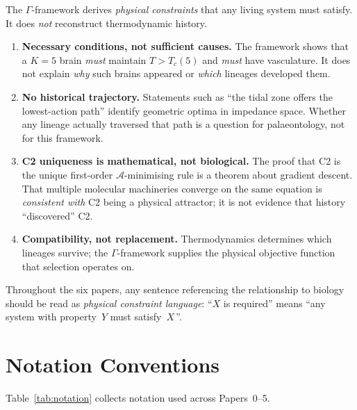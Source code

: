 \documentclass[aps,pre,twocolumn,superscriptaddress,floatfix]{revtex4-2}
\begin{document}
The $\Gamma$-framework derives \emph{physical constraints}
that any living system must satisfy.
It does \emph{not} reconstruct thermodynamic history.

\begin{enumerate}
  \item \textbf{Necessary conditions, not sufficient causes.}
    The framework shows that a $K{=}5$ brain \emph{must}
    maintain $T > T_c(5)$ and \emph{must} have vasculature.
    It does not explain \emph{why} such brains appeared
    or \emph{which} lineages developed them.

  \item \textbf{No historical trajectory.}
    Statements such as ``the tidal zone offers the
    lowest-action path'' identify geometric optima
    in impedance space.
    Whether any lineage actually traversed that path
    is a question for palaeontology, not for this
    framework.

  \item \textbf{C2 uniqueness is mathematical, not
    biological.}
    The proof that C2 is the unique first-order
    $\mathcal{A}$-minimising rule is a theorem about
    gradient descent.
    That multiple molecular machineries converge on the
    same equation is \emph{consistent with} C2 being a
    physical attractor; it is not evidence that history
    ``discovered'' C2.

  \item \textbf{Compatibility, not replacement.}
    Thermodynamics determines which lineages survive;
    the $\Gamma$-framework supplies the physical
    objective function that selection operates on.
\end{enumerate}

\noindent
Throughout the six papers, any sentence referencing
the relationship to biology should be read as \emph{physical constraint
language}: ``$X$ is required'' means ``any system with
property~$Y$ must satisfy~$X$\,''.


\section{Notation Conventions}
\label{sec:notation}

Table~\ref{tab:notation} collects notation used across
Papers~0--5.
\end{document}
